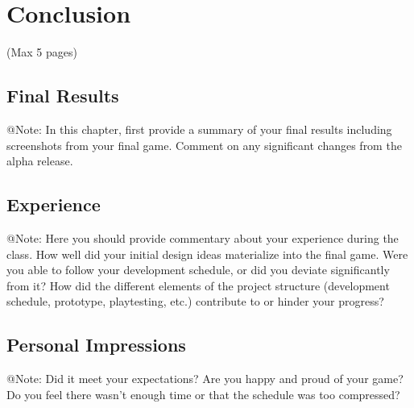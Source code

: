 \chapter{Conclusion}

\begin{TempText}
	(Max 5 pages)
\end{TempText}


\section{Final Results}

\begin{TempText}
	@Note: In this chapter, first provide a summary of your final results including screenshots from your final game. Comment on any significant changes from the alpha release.
\end{TempText}


\section{Experience}

\begin{TempText}
	@Note: Here you should provide commentary about your experience during the class. How well did your initial design ideas materialize into the final game. Were you able to follow your development schedule, or did you deviate significantly from it? How did the different elements of the project structure (development schedule, prototype, playtesting, etc.) contribute to or hinder your progress?
\end{TempText}


\section{Personal Impressions}

\begin{TempText}
	@Note: Did it meet your expectations? Are you happy and proud of your game? Do you feel there wasn't enough time or that the schedule was too compressed?
\end{TempText}

